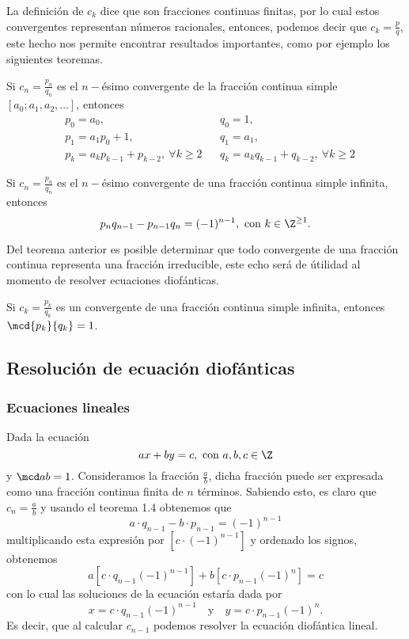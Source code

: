 La definición de $c_k$ dice que son fracciones continuas finitas, por lo cual estos convergentes representan números racionales,
entonces, podemos decir que $c_k = \frac{p}{q}$, este hecho nos permite encontrar resultados importantes, como por ejemplo los siguientes teoremas.

\begin{theorem.box}{}{}
    Si $c_n = \frac{p_n}{q_n}$ es el $n-$ésimo convergente de la fracción continua simple $[a_0; a_1, a_2, \ldots]$, entonces
    \begin{align*}
        &p_0 = a_0, && q_0 = 1,\\
        &p_1 = a_1 p_0 + 1, && q_1 = a_1,\\
        &p_k = a_k p_{k - 1} + p_{k - 2},\ \forall k \geq 2 && q_k = a_k q_{k - 1} + q_{k - 2},\ \forall k \geq 2
    \end{align*}
\end{theorem.box}

\begin{theorem.box}{}{}
    Si $c_n = \frac{p_n}{q_n}$ es el $n-$ésimo convergente de una fracción continua simple infinita, entonces
    \[
        p_n q_{n - 1} - p_{n - 1}q_n = (- 1)^{n-1}, \ \text{con}\ k \in \Z^{\geq 1}.
    \]
\end{theorem.box}
Del teorema anterior es posible determinar que todo convergente de una fracción continua representa una fracción irreducible, este echo será de útilidad al momento de resolver ecuaciones diofánticas.
\begin{corollary}
    Si $c_k = \frac{p_k}{q_k}$ es un convergente de una fracción continua simple infinita, entonces $\mcd{p_k}{q_k} = 1$.
\end{corollary}



\subsection{Resolución de ecuación diofánticas}

\subsubsection{Ecuaciones lineales}

Dada la ecuación
\[
    ax + by = c,\ \text{con}\ a,b,c \in \Z
\]
y $\mcd a b = 1$.
Consideramos la fracción $\frac{a}{b}$, dicha fracción puede ser expresada como una fracción continua finita de $n$ términos.
Sabiendo esto, es claro que $c_n = \frac{a}{b}$ y usando el teorema 1.4 obtenemos que
\[
    a\cdot q_{n - 1} - b\cdot p_{n - 1} = (-1)^{n- 1}
\]
multiplicando esta expresión por $\left[c \cdot (-1)^{n - 1}\right]$ y ordenado los signos, obtenemos
\[
    a \left[c\cdot q_{n - 1} (-1)^{n - 1}\right] + b \left[c \cdot p_{n - 1} (-1)^n\right] = c
\]
con lo cual las soluciones de la ecuación estaría dada por
\[
    x = c \cdot q_{n - 1} (-1)^{n - 1} \quad \text{y} \quad y = c \cdot p_{n - 1} (-1)^{n}.
\]
Es decir, que al calcular $c_{n - 1}$ podemos resolver la ecuación diofántica lineal.

